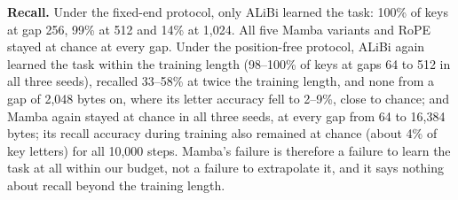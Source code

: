\documentclass[11pt]{article}
\begin{document}
\textbf{Recall.} Under the fixed-end protocol, only ALiBi learned the task: 100\% of keys at gap 256, 99\% at 512 and 14\% at 1,024. All five Mamba variants and RoPE stayed at chance at every gap. Under the position-free protocol, ALiBi again learned the task within the training length (98--100\% of keys at gaps 64 to 512 in all three seeds), recalled 33--58\% at twice the training length, and none from a gap of 2,048 bytes on, where its letter accuracy fell to 2--9\%, close to chance; and Mamba again stayed at chance in all three seeds, at every gap from 64 to 16,384 bytes; its recall accuracy during training also remained at chance (about 4\% of key letters) for all 10,000 steps. Mamba's failure is therefore a failure to learn the task at all within our budget, not a failure to extrapolate it, and it says nothing about recall beyond the training length.
\end{document}
